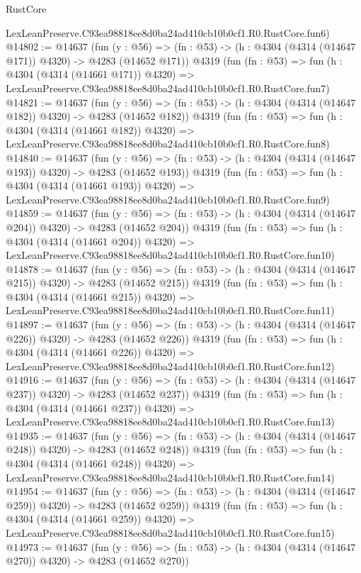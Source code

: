 \begin{lexlean}{RustCore}
\begin{coremodule}
    LexLeanPreserve.C93ea98818ee8d0ba24ad410cb10b0cf1.R0.RustCore.fun6)
@14802 := @14637
    (fun (y : @56) => (fn : @53) -> (h : @4304 (@4314 (@14647 @171)) @4320) -> @4283 (@14652 @171))
    @4319
    (fun (fn : @53) =>
    fun (h : @4304 (@4314 (@14661 @171)) @4320) =>
    LexLeanPreserve.C93ea98818ee8d0ba24ad410cb10b0cf1.R0.RustCore.fun7)
@14821 := @14637
    (fun (y : @56) => (fn : @53) -> (h : @4304 (@4314 (@14647 @182)) @4320) -> @4283 (@14652 @182))
    @4319
    (fun (fn : @53) =>
    fun (h : @4304 (@4314 (@14661 @182)) @4320) =>
    LexLeanPreserve.C93ea98818ee8d0ba24ad410cb10b0cf1.R0.RustCore.fun8)
@14840 := @14637
    (fun (y : @56) => (fn : @53) -> (h : @4304 (@4314 (@14647 @193)) @4320) -> @4283 (@14652 @193))
    @4319
    (fun (fn : @53) =>
    fun (h : @4304 (@4314 (@14661 @193)) @4320) =>
    LexLeanPreserve.C93ea98818ee8d0ba24ad410cb10b0cf1.R0.RustCore.fun9)
@14859 := @14637
    (fun (y : @56) => (fn : @53) -> (h : @4304 (@4314 (@14647 @204)) @4320) -> @4283 (@14652 @204))
    @4319
    (fun (fn : @53) =>
    fun (h : @4304 (@4314 (@14661 @204)) @4320) =>
    LexLeanPreserve.C93ea98818ee8d0ba24ad410cb10b0cf1.R0.RustCore.fun10)
@14878 := @14637
    (fun (y : @56) => (fn : @53) -> (h : @4304 (@4314 (@14647 @215)) @4320) -> @4283 (@14652 @215))
    @4319
    (fun (fn : @53) =>
    fun (h : @4304 (@4314 (@14661 @215)) @4320) =>
    LexLeanPreserve.C93ea98818ee8d0ba24ad410cb10b0cf1.R0.RustCore.fun11)
@14897 := @14637
    (fun (y : @56) => (fn : @53) -> (h : @4304 (@4314 (@14647 @226)) @4320) -> @4283 (@14652 @226))
    @4319
    (fun (fn : @53) =>
    fun (h : @4304 (@4314 (@14661 @226)) @4320) =>
    LexLeanPreserve.C93ea98818ee8d0ba24ad410cb10b0cf1.R0.RustCore.fun12)
@14916 := @14637
    (fun (y : @56) => (fn : @53) -> (h : @4304 (@4314 (@14647 @237)) @4320) -> @4283 (@14652 @237))
    @4319
    (fun (fn : @53) =>
    fun (h : @4304 (@4314 (@14661 @237)) @4320) =>
    LexLeanPreserve.C93ea98818ee8d0ba24ad410cb10b0cf1.R0.RustCore.fun13)
@14935 := @14637
    (fun (y : @56) => (fn : @53) -> (h : @4304 (@4314 (@14647 @248)) @4320) -> @4283 (@14652 @248))
    @4319
    (fun (fn : @53) =>
    fun (h : @4304 (@4314 (@14661 @248)) @4320) =>
    LexLeanPreserve.C93ea98818ee8d0ba24ad410cb10b0cf1.R0.RustCore.fun14)
@14954 := @14637
    (fun (y : @56) => (fn : @53) -> (h : @4304 (@4314 (@14647 @259)) @4320) -> @4283 (@14652 @259))
    @4319
    (fun (fn : @53) =>
    fun (h : @4304 (@4314 (@14661 @259)) @4320) =>
    LexLeanPreserve.C93ea98818ee8d0ba24ad410cb10b0cf1.R0.RustCore.fun15)
@14973 := @14637
    (fun (y : @56) => (fn : @53) -> (h : @4304 (@4314 (@14647 @270)) @4320) -> @4283 (@14652 @270))

\end{coremodule}
\end{lexlean}
